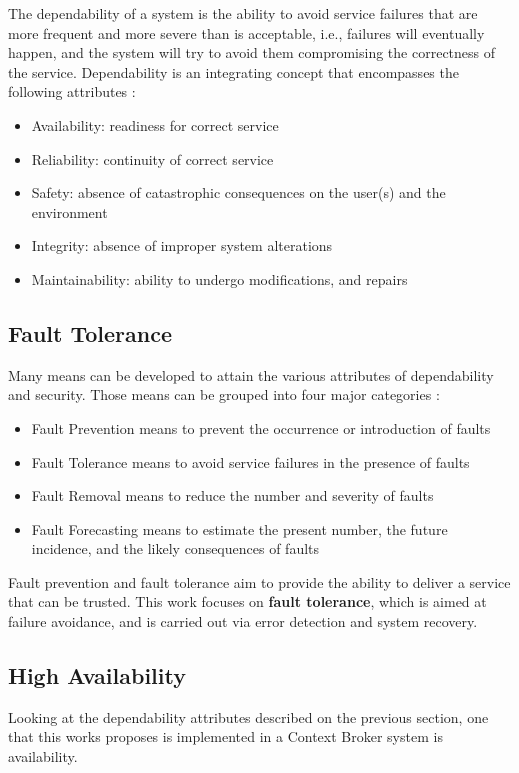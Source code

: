 The dependability of a system is the ability to avoid service failures that are more frequent and more severe than is acceptable, i.e., failures will eventually happen, and the system will try to avoid them compromising the correctness of the service. Dependability is an integrating concept that encompasses the following attributes \cite{avivzienis2004basic}:
\begin{itemize}
	\item{Availability:} readiness for correct service
	\item{Reliability:} continuity of correct service
	\item{Safety:} absence of catastrophic consequences on the user(s) and the environment
	\item{Integrity:} absence of improper system alterations
	\item{Maintainability:} ability to undergo modifications, and repairs
\end{itemize}

\subsection{Fault Tolerance}
Many means can be developed to attain the various attributes of dependability and security. Those means can be grouped into four major categories \cite{avivzienis2004basic}:
\begin{itemize}
	\item{Fault Prevention} means to prevent the occurrence or introduction of faults
	\item{Fault Tolerance} means to avoid service failures in the presence of faults
	\item{Fault Removal} means to reduce the number and severity of faults
	\item{Fault Forecasting} means to estimate the present number, the future incidence, and the likely consequences of faults
\end{itemize}

Fault prevention and fault tolerance aim to provide the ability to deliver a service that can be trusted. This work focuses on \textbf{fault tolerance}, which is aimed at failure avoidance, and is carried out via error detection and system recovery.



\subsection{High Availability}
Looking at the dependability attributes described on the previous section, one that this works proposes is implemented in a Context Broker system is availability.

